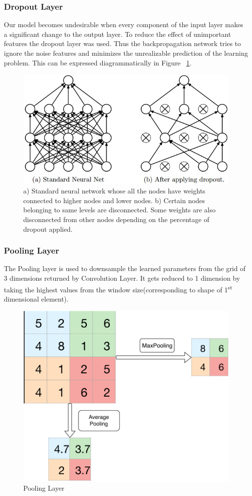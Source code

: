   \subsubsection{Dropout Layer}
  Our model becomes undesirable when every component of the input layer makes a significant change to the output layer. To reduce the effect of unimportant features the dropout layer was used. Thus the backpropagation network tries to ignore the noise features and minimizes the unrealizable prediction of the learning problem. This can be expressed diagrammatically in Figure ~\ref{fig:dropout}.
  \begin{figure}
    [H] \centering
    \includegraphics[width=.5\linewidth]{mainmatter/3-Methodology/images/dropout.jpeg}
    \caption[Dropout Layer]{a) Standard neural network whose all the nodes have weights connected to higher nodes and lower nodes. b) Certain nodes belonging to same levels are disconnected. Some weights are also disconnected from other nodes depending on the percentage of dropout applied.}
    \label{fig:dropout}
  
  \end{figure}
  
  \subsubsection{Pooling Layer}
  The Pooling layer is used to downsample the learned parameters from the grid of 3 dimensions returned by Convolution Layer. It gets reduced to 1 dimension by taking the highest values from the window size(corresponding to shape of 1\textsuperscript{st} dimensional element).
  \begin{figure}[H] \centering
    \includegraphics[width=.75\linewidth]{mainmatter/3-Methodology/images/pooling.pdf}
    \caption{Pooling Layer}
    \label{fig:pool_layer}
  \end{figure}
  
